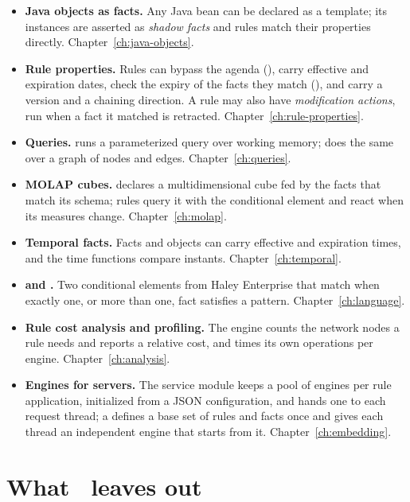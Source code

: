 \begin{itemize}
\item \textbf{Java objects as facts.} Any Java bean can be declared as a
  template; its instances are asserted as \emph{shadow facts} and rules match
  their properties directly. Chapter~\ref{ch:java-objects}.
\item \textbf{Rule properties.} Rules can bypass the agenda
  (), carry effective and expiration dates, check the
  expiry of the facts they match (), and carry a
  version and a chaining direction. A rule may also have
  \emph{modification actions}, run when a fact it matched is retracted.
  Chapter~\ref{ch:rule-properties}.
\item \textbf{Queries.}  runs a parameterized query over
  working memory;  does the same over a graph of nodes and
  edges. Chapter~\ref{ch:queries}.
\item \textbf{MOLAP cubes.}  declares a multidimensional cube
  fed by the facts that match its schema; rules query it with the
   conditional element and react when its measures change.
  Chapter~\ref{ch:molap}.
\item \textbf{Temporal facts.} Facts and objects can carry effective and
  expiration times, and the time functions compare instants.
  Chapter~\ref{ch:temporal}.
\item \textbf{ and .} Two conditional elements from
  Haley Enterprise that match when exactly one, or more than one, fact
  satisfies a pattern. Chapter~\ref{ch:language}.
\item \textbf{Rule cost analysis and profiling.} The engine counts the
  network nodes a rule needs and reports a relative cost, and times its
  own operations per engine. Chapter~\ref{ch:analysis}.
\item \textbf{Engines for servers.} The service module keeps a pool of
  engines per rule application, initialized from a JSON configuration,
  and hands one to each request thread; a  defines a base
  set of rules and facts once and gives each thread an independent
  engine that starts from it. Chapter~\ref{ch:embedding}.
\end{itemize}

\section{What \Morendo\ leaves out}

